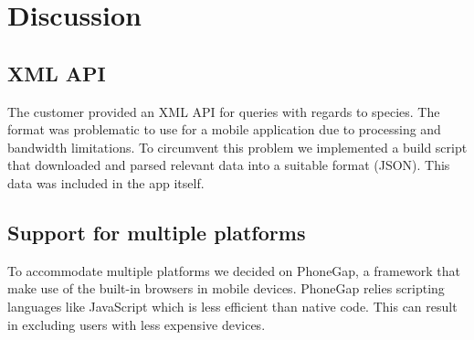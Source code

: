 \section{Discussion}

\subsection{XML API}

The customer provided an XML API for queries with regards to species. The
format was problematic to use for a mobile application due to processing and
bandwidth limitations. To circumvent this problem we implemented a build script
that downloaded and parsed relevant data into a suitable format (JSON). This data
was included in the app itself.

\subsection{Support for multiple platforms}

To accommodate multiple platforms we decided on PhoneGap, a framework that make
use of the built-in browsers in mobile devices. PhoneGap relies scripting
languages like JavaScript which is less efficient than native code. This can
result in excluding users with less expensive devices.
